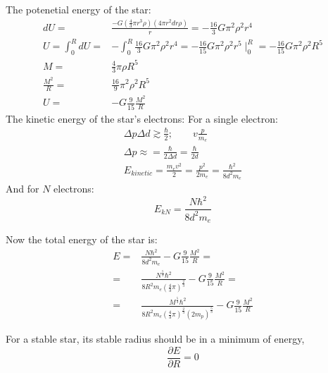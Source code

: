 			The potenetial energy of the star:
			\begin{align}
				dU =& \frac{-G(\frac{4}{3}\pi r^3 \rho)(4\pi r^2 dr \rho)}{r} = -\frac{16}{3}G\pi^2 \rho^2 r^4 \\
				U = \int_0^R dU =& -\int_0^R\frac{16}{3}G\pi^2 \rho^2 r^4 = -\frac{16}{15}G\pi^2 \rho^2 r^5 \mid_0^R = -\frac{16}{15}G\pi^2 \rho^2 R^5 \\
				M =& \frac{4}{3}\pi\rho R^5 \\
				\frac{M^2}{R} =& \frac{16}{9} \pi^2 \rho^2 R^5 \\
				U =& -G \frac{9}{15} \frac{M^2}{R}
			\end{align}
			The kinetic energy of the star's electrons:
			For a single electron:
			\begin{align}
				\Delta p \Delta d \gtrsim \frac{\hbar}{2}; \qquad v \frac{p}{m_e} \\
				\Delta p \approx = \frac{\hbar}{2 \Delta d} = \frac{\hbar}{2 d} \\
				E_{kinetic} = \frac{m_ev^2}{2} = \frac{p^2}{2m_e} = \frac{\hbar^2}{8d^2m_e}
			\end{align}
			And for $N$ electrons:
			\begin{equation}
				E_{kN} = \frac{N\hbar^2}{8d^2m_e}
				\label{starkinunrel}
			\end{equation}			
			
			Now the total energy of the star is:
			\begin{align}
				E =& \frac{N\hbar^2}{8d^2m_e} -G \frac{9}{15} \frac{M^2}{R} = \\
				=& \frac{N^{\frac{5}{3}}\hbar^2}{8R^2m_e(\frac{4}{3}\pi)^{\frac{2}{3}}} -G \frac{9}{15} \frac{M^2}{R} = \\
				=& \frac{M^{\frac{5}{3}}\hbar^2}{8R^2m_e(\frac{4}{3}\pi)^{\frac{2}{3}}(2m_p)^{\frac{5}{3}}} -G \frac{9}{15} \frac{M^2}{R}
			\end{align}
			
			For a stable star, its stable radius should be in a minimum of energy,
			\begin{equation}
				\frac{\partial E}{\partial R} = 0
			\end{equation}
			
